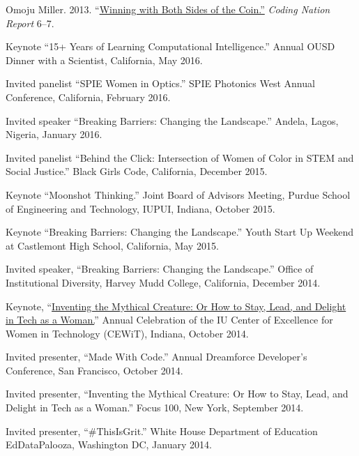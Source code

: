 \documentclass[11pt,article,oneside]{memoir}
\begin{document}
\ind Omoju Miller. 2013. ``\href{http://kaporcenter.org/wp-content/uploads/2013/10/Kapor_CodingLandscape_R3.pdf}{Winning with Both Sides of the Coin.''} \emph{Coding Nation Report} 6--7. 
 
 \bigskip


\medskip

\ind Keynote ``15+ Years of Learning Computational Intelligence.'' Annual OUSD Dinner with a Scientist, California, May 2016. 

\ind Invited panelist ``SPIE Women in Optics.'' SPIE Photonics West Annual Conference, California, February 2016. 

\ind Invited speaker ``Breaking Barriers: Changing the Landscape.'' Andela, Lagos, Nigeria, January 2016. 

\ind Invited panelist ``Behind the Click: Intersection of Women of Color in STEM and Social Justice.'' Black Girls Code, California, December 2015.

\ind Keynote ``Moonshot Thinking.'' Joint Board of Advisors Meeting, Purdue School of Engineering and Technology, IUPUI, Indiana, October 2015.

\ind Keynote ``Breaking Barriers: Changing the Landscape.'' Youth Start Up Weekend at Castlemont High School, California, May 2015. 

\ind Invited speaker, ``Breaking Barriers: Changing the Landscape.'' Office of Institutional Diversity, Harvey Mudd College, California, December 2014. 

\ind Keynote, ``\href{https://www.youtube.com/watch?v=owXez6sIRbY&ab_channel=IUCEWIT}{Inventing the Mythical Creature: Or How to Stay, Lead, and Delight in Tech as a Woman.}'' Annual Celebration of the IU Center of Excellence for Women in Technology (CEWiT), Indiana, October 2014.

\ind Invited presenter, ``Made With Code.'' Annual Dreamforce Developer's Conference, San Francisco, October 2014.

\ind Invited presenter, ``Inventing the Mythical Creature: Or How to Stay, Lead, and Delight in Tech as a Woman.'' Focus 100, New York, September 2014.

\ind Invited presenter, ``\#ThisIsGrit.'' White House Department of Education EdDataPalooza, Washington DC, January 2014.
\end{document}
